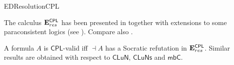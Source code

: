 \begin{entry}{EDResolutionCPL}
\begin{history}
The calculus $\mathbf{E}^\mathsf{CPL}_{res}$ has been presented in \cite{SzChDLJ:LFI} together with extensions to some paraconsistent logics (see ). Compare also .
\end{history}

\begin{technicalities}
A formula $A$ is $\mathsf{CPL}$-valid iff $\dashv A$ has a Socratic refutation in $\mathbf{E}^\mathsf{CPL}_{res}$. Similar results are obtained with respect to $\mathsf{CLuN}$, $\mathsf{CLuNs}$ and $\mathsf{mbC}$.
\end{technicalities}













\end{entry}
